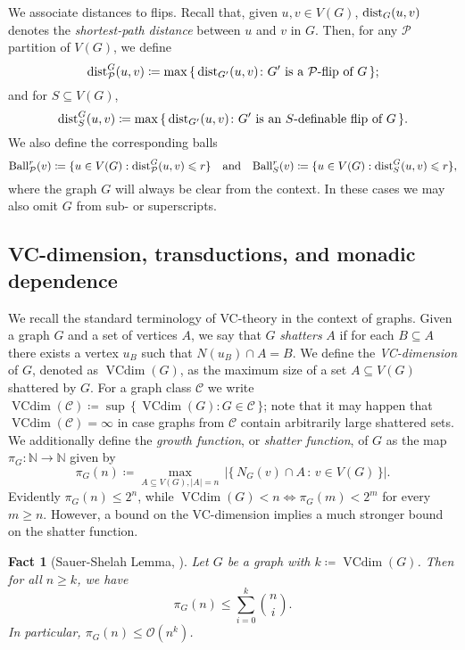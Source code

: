 \documentclass[a4paper,UKenglish,cleveref, autoref, thm-restate]{lipics-v2021}
\newtheorem{fact}[theorem]{Fact}
\DeclareMathOperator{\VCdim}{VCdim}
\renewcommand{\cal}{\mathcal}
\newcommand{\N}[0]{\mathrm{\mathbb{N}}}
\newcommand{\dist}{\textnormal{dist}}
\newcommand{\CC}{\mathcal{C}}
\newcommand{\C}{\CC}
\newcommand{\PP}{\mathcal{P}}
\renewcommand{\le}{\leqslant}
\renewcommand{\leq}{\le}
\renewcommand{\ge}{\geqslant}
\renewcommand{\geq}{\ge}
\newcommand{\Ball}{\mathrm{Ball}}
\begin{document}
We associate distances to flips.
Recall that, given $u,v \in V(G)$, $\dist_G(u,v)$ denotes the \emph{shortest-path distance} between $u$ and $v$ in $G$.
Then, for any $\cal P$ partition of $V(G)$, we define
\[\dist^G_{\cal P}(u,v) \coloneqq \max\,\{\,\dist_{G'}(u,v)\colon G'\text{ is a }\cal P\textrm{-flip of }G\,\};\]
and for $S \subseteq V(G)$,
\[\dist^G_S(u,v) \coloneqq \max\,\{\,\dist_{G'}(u,v)\colon G'\text{ is an }S\textrm{-definable flip of }G\,\}.\]
We also define the corresponding balls
\[
  \Ball_\PP^r(v) \coloneqq \{ u \in V(G) : \dist^G_\PP(u,v) \leq r \} 
  \quad
  \text{and}
  \quad
  \Ball_S^r(v) \coloneqq \{ u \in V(G) : \dist^G_S(u,v) \leq r \}, 
\]
where the graph $G$ will always be clear from the context.
In these cases we may also omit $G$ from sub- or superscripts.

\subsection{VC-dimension, transductions, and monadic dependence}\label{lem:vc-trans-mondep}

We recall the standard terminology of VC-theory in the context of graphs.
Given a graph $G$ and a set of vertices $A$, we say that  $G$ \emph{shatters} $A$ if for each $B\subseteq A$ there exists a vertex $u_B$ such that $N(u_B)\cap A=B$.
We define the \emph{VC-dimension} of $G$, denoted as $\VCdim(G)$, as the maximum size of a set $A\subseteq V(G)$ shattered by $G$. For a graph class $\C$ we write $\VCdim(\C)\coloneqq\sup\,\{\,\VCdim(G)\colon G \in \C\,\}$; note that it may happen that $\VCdim(\C)=\infty$ in case graphs from $\C$ contain arbitrarily large shattered sets.
We additionally define the \emph{growth function}, or \emph{shatter function}, of $G$ as the map $\pi_G:\N \to \N$ given by 
\[ \pi_G(n)\coloneqq \max_{A \subseteq V(G), |A|=n}\,|\{\, N_G(v)\cap A\,\colon\,v \in V(G)\,\}|. \]
Evidently $\pi_G(n)\leq 2^n$, while $\VCdim(G)<n \iff \pi_G(m) < 2^m$ for every $m \geq n$. However, a bound on the VC-dimension implies a much stronger bound on the shatter function.

\begin{fact}[Sauer-Shelah Lemma, \cite{Sauer72,Shelah72}]\label{sauershelah}
  Let $G$ be a graph with $k \coloneqq \VCdim(G)$.
  Then for all $n\geq k$, we have
    \[ \pi_G(n) \leq \sum_{i=0}^k \binom{n}{i}.\]
    In particular, $\pi_G(n) \leq {\cal O}(n^k)$. 
\end{fact}
\end{document}
